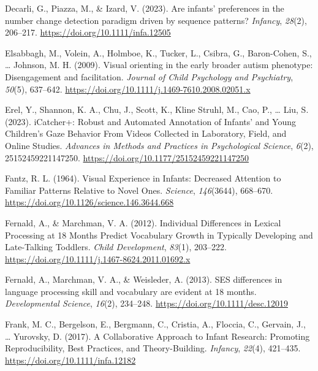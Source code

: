 \documentclass[
  english,
  man,floatsintext]{apa6}
\newlength{\cslhangindent}
\newenvironment{CSLReferences}[2] %
 {\begin{list}{}{%
  \setlength{\itemindent}{0pt}
  \setlength{\leftmargin}{0pt}
  \setlength{\parsep}{0pt}
  \ifodd #1
   \setlength{\leftmargin}{\cslhangindent}
   \setlength{\itemindent}{-1\cslhangindent}
  \fi
  \setlength{\itemsep}{#2\baselineskip}}}
 {\end{list}}
\begin{document}
\begin{CSLReferences}{1}{0}
Decarli, G., Piazza, M., \& Izard, V. (2023). Are infants' preferences in the number change detection paradigm driven by sequence patterns? \emph{Infancy}, \emph{28}(2), 206--217. \url{https://doi.org/10.1111/infa.12505}

Elsabbagh, M., Volein, A., Holmboe, K., Tucker, L., Csibra, G., Baron-Cohen, S., \ldots{} Johnson, M. H. (2009). Visual orienting in the early broader autism phenotype: Disengagement and facilitation. \emph{Journal of Child Psychology and Psychiatry}, \emph{50}(5), 637--642. \url{https://doi.org/10.1111/j.1469-7610.2008.02051.x}

Erel, Y., Shannon, K. A., Chu, J., Scott, K., Kline Struhl, M., Cao, P., \ldots{} Liu, S. (2023). {iCatcher}+: {Robust} and {Automated Annotation} of {Infants}' and {Young Children}'s {Gaze Behavior From Videos Collected} in {Laboratory}, {Field}, and {Online Studies}. \emph{Advances in Methods and Practices in Psychological Science}, \emph{6}(2), 25152459221147250. \url{https://doi.org/10.1177/25152459221147250}

Fantz, R. L. (1964). Visual {Experience} in {Infants}: {Decreased Attention} to {Familiar Patterns Relative} to {Novel Ones}. \emph{Science}, \emph{146}(3644), 668--670. \url{https://doi.org/10.1126/science.146.3644.668}

Fernald, A., \& Marchman, V. A. (2012). Individual {Differences} in {Lexical Processing} at 18 {Months Predict Vocabulary Growth} in {Typically Developing} and {Late-Talking Toddlers}. \emph{Child Development}, \emph{83}(1), 203--222. \url{https://doi.org/10.1111/j.1467-8624.2011.01692.x}

Fernald, A., Marchman, V. A., \& Weisleder, A. (2013). {SES} differences in language processing skill and vocabulary are evident at 18 months. \emph{Developmental Science}, \emph{16}(2), 234--248. \url{https://doi.org/10.1111/desc.12019}

Frank, M. C., Bergelson, E., Bergmann, C., Cristia, A., Floccia, C., Gervain, J., \ldots{} Yurovsky, D. (2017). A {Collaborative Approach} to {Infant Research}: {Promoting Reproducibility}, {Best Practices}, and {Theory-Building}. \emph{Infancy}, \emph{22}(4), 421--435. \url{https://doi.org/10.1111/infa.12182}


\end{CSLReferences}
\end{document}
